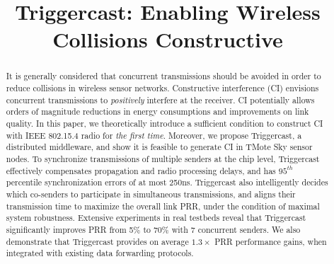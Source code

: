 \documentclass[conference]{IEEEtran}
\begin{document}
\title{Triggercast: Enabling Wireless Collisions Constructive}

\author{
}

\maketitle

\begin{abstract}
It is generally considered that concurrent transmissions should be avoided in order to reduce collisions in wireless sensor networks.
Constructive interference (CI) envisions concurrent transmissions to \emph{positively} interfere at the receiver.
CI potentially allows orders of magnitude reductions in energy consumptions and improvements on link quality.
In this paper, we theoretically introduce a sufficient condition to construct CI with IEEE 802.15.4 radio for \emph{the first time}.
Moreover, we propose Triggercast, a distributed middleware, and show it is feasible to generate CI in TMote Sky sensor nodes.
To synchronize transmissions of multiple senders at the chip level, Triggercast effectively compensates propagation and radio processing delays, and has $95^{th}$ percentile synchronization errors of at most 250ns.
Triggercast also intelligently decides which co-senders to participate in simultaneous
transmissions, and aligns their transmission time to maximize the overall link PRR, under the condition of maximal system robustness.
Extensive experiments in real testbeds reveal that Triggercast significantly improves PRR from 5\% to 70\% with 7 concurrent senders.
We also demonstrate that Triggercast provides on average $1.3\times$ PRR performance gains, when integrated with existing data forwarding protocols.
\end{abstract}
\end{document}
